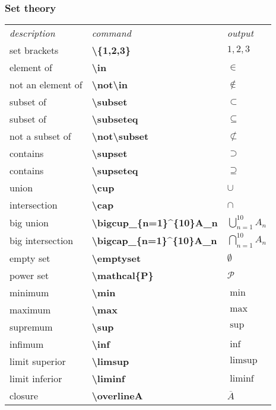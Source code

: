 \documentclass{article}
\begin{document}
\subsubsection{Set theory}

\begin{table}[H]
 \begin{tabular}{lll}
  \textit{description} &\textit{command} &\textit{output}\\
  set brackets &\textbf{\textbackslash \{1,2,3\}} &${1,2,3}$\\
  element of &\textbf{\textbackslash in} &$\in$\\
  not an element of &\textbf{\textbackslash not\textbackslash in} &$\not\in$\\
  subset of &\textbf{\textbackslash subset} &$\subset$\\
  subset of &\textbf{\textbackslash subseteq} &$\subseteq$\\
  not a subset of &\textbf{\textbackslash not\textbackslash subset} &$\not\subset$\\
  contains &\textbf{\textbackslash supset} &$\supset$\\
  contains &\textbf{\textbackslash supseteq} &$\supseteq$\\
  union &\textbf{\textbackslash cup} &$\cup$\\
  intersection &\textbf{\textbackslash cap} &$\cap$\\
  big union &\textbf{\textbackslash bigcup\_\{n=1\}\textasciicircum\{10\}A\_n} &$\bigcup_{n=1}^{10}A_n$\\
  big intersection &\textbf{\textbackslash bigcap\_\{n=1\}\textasciicircum\{10\}A\_n} &$\bigcap_{n=1}^{10}A_n$\\
  empty set &\textbf{\textbackslash emptyset} &$\emptyset$\\
  power set &\textbf{\textbackslash mathcal\{P\}} &$\mathcal{P}$\\
  minimum &\textbf{\textbackslash min} &$\min$\\
  maximum &\textbf{\textbackslash max} &$\max$\\
  supremum &\textbf{\textbackslash sup} &$\sup$\\
  infimum &\textbf{\textbackslash inf} &$\inf$\\
  limit superior &\textbf{\textbackslash limsup} &$\limsup$\\
  limit inferior &\textbf{\textbackslash liminf} &$\liminf$\\
  closure &\textbf{\textbackslash overline{A}} &$\overline{A}$\\
 \end{tabular}
\end{table}
\end{document}
